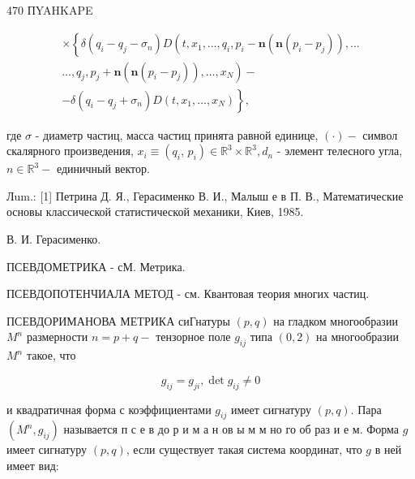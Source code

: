 \documentclass[10pt]{article}
\begin{document}
470 ПYAHKAPE



\[

\begin{gathered}

\times\left\{\delta ( q _ { i } - q _ { j } - \sigma _ { n } ) D \left(t, x_{1}, \ldots, q_{i}, p_{i}-\boldsymbol{n}\left(\boldsymbol{n}\left(p_{i}-p_{j}\right)\right), \ldots\right.\right. \\

\left.\ldots, q_{j}, p_{j}+\boldsymbol{n}\left(\boldsymbol{n}\left(p_{i}-p_{j}\right)\right), \ldots, x_{N}\right)- \\

\left.-\delta\left(q_{i}-q_{j}+\sigma_{n}\right) D\left(t, x_{1}, \ldots, x_{N}\right)\right\},

\end{gathered}

\]



где $\sigma$ - диаметр частиц, масса частиц принята равной единице, $(\cdot)-$ символ скалярного произведения, $x_{i} \equiv\left(q_{i}\right.$, $\left.p_{i}\right) \in \mathbb{R}^{3} \times \mathbb{R}^{3}, d_{n}$ - элемент телесного угла, $n \in \mathbb{R}^{3}-$ единичный вектор.



Лum.: [1] Петрина Д. Я., Герасименко В. И., Малыш е в П. В., Математические основы классической статистической механики, Киев, 1985.



В. И. Герасименко.



ПСЕВДОМЕТРИКА - сМ. Метрика.



ПСЕВДОПОТЕНЧИАЛА МЕТОД - см. Квантовая теория многих частиц.



ПСЕВДОРИМАНОВА МЕТРИКА сиГнатуры $(p, q)$ на гладком многообразии $M^{n}$ размерности $n=p+q-$ тензорное поле $g_{i j}$ типа $(0,2)$ на многообразии $M^{n}$ такое, что



\[

g_{i j}=g_{j i}, \operatorname{det} g_{i j} \neq 0

\]



и квадратичная форма с коэффициентами $g_{i j}$ имеет сигнатуру $(p, q)$. Пара $\left(M^{n}, g_{i j}\right)$ называется п с е в до р и м а н ов ы м м но го об раз и е м. Форма $g$ имеет сигнатуру $(p, q)$, если существует такая система координат, что $g$ в ней имеет вид:
\end{document}
